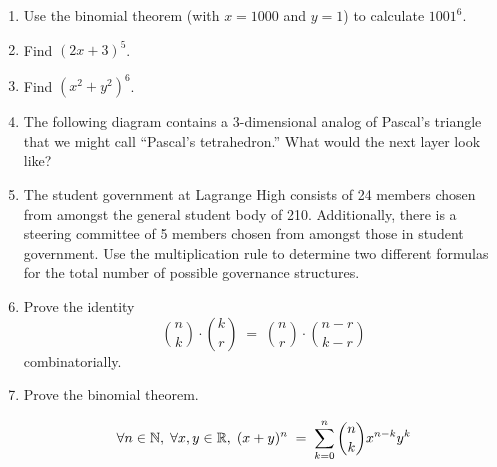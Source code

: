\begin{enumerate}

\item Use the binomial theorem (with $x=1000$ and $y=1$) to calculate
$1001^6$.

\wbvfill

\item Find $(2x+3)^5$.

\wbvfill

\item Find $(x^2+y^2)^6$.

\wbvfill

\workbookpagebreak

\item The following diagram contains a 3-dimensional analog of
Pascal's triangle that we might call ``Pascal's tetrahedron.'' 
What would the next layer look like?

\begin{center}

\end{center}

\wbvfill

\item The student government at Lagrange High consists of 24 members chosen
from amongst the general student body of 210.  Additionally, there
is a steering committee of 5 members chosen from amongst those in
student government.  Use the multiplication rule to determine two different
formulas for the total number of possible governance structures.

\wbvfill

\workbookpagebreak

\item Prove the identity
\[ \binom{n}{k} \cdot \binom{k}{r} \; = \; \binom{n}{r} \cdot \binom{n-r}{k-r} \]
combinatorially.

\wbvfill

\item Prove the binomial theorem.

\[ \forall n \in {\mathbb N}, \; \forall x,y \in {\mathbb R}, \; 
(x+y)^n \; = \; \sum_{k=0}^n \binom{n}{k} x^{n-k}y^k \]

\wbvfill

\workbookpagebreak

\end{enumerate}


